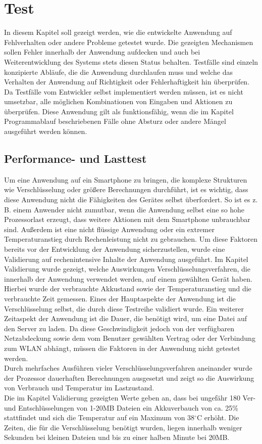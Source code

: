 \documentclass[10pt, a4paper,headsepline,pointednumbers]{scrreprt}
\begin{document}
\chapter{Test}
In diesem Kapitel soll gezeigt werden, wie die entwickelte Anwendung auf Fehlverhalten oder andere Probleme getestet wurde. Die gezeigten Mechanismen sollen Fehler innerhalb der Anwendung aufdecken und auch bei Weiterentwicklung des Systems stets diesen Status behalten. Testfälle sind einzeln konzipierte Abläufe, die die Anwendung durchlaufen muss und welche das Verhalten der Anwendung auf Richtigkeit oder Fehlerhaftigkeit hin überprüfen. Da Testfälle vom Entwickler selbst implementiert werden müssen, ist es nicht umsetzbar, alle möglichen Kombinationen von Eingaben und Aktionen zu überprüfen. Diese Anwendung gilt als funktionsfähig, wenn die im Kapitel Programmablauf beschriebenen Fälle ohne Absturz oder andere Mängel ausgeführt werden können.


\section{Performance- und Lasttest}
Um eine Anwendung auf ein Smartphone zu bringen, die komplexe Strukturen wie Verschlüsselung oder größere Berechnungen durchführt, ist es wichtig, dass diese Anwendung nicht die Fähigkeiten des Gerätes selbst überfordert. So ist es z. B. einem Anwender nicht zumutbar, wenn die Anwendung selbst eine so hohe Prozessorlast erzeugt, dass weitere Aktionen mit dem Smartphone unbrauchbar sind. Außerdem ist eine nicht flüssige Anwendung oder ein extremer Temperaturanstieg durch Rechenleistung nicht zu gebrauchen. Um diese Faktoren bereits vor der Entwicklung der Anwendung sicherzustellen, wurde eine Validierung auf rechenintensive Inhalte der Anwendung ausgeführt. Im Kapitel Validierung wurde gezeigt, welche Auswirkungen Verschlüsselungsverfahren, die innerhalb der Anwendung verwendet werden, auf einem gewählten Gerät haben. Hierbei wurde der verbrauchte Akkustand sowie der Temperaturanstieg und die verbrauchte Zeit gemessen. Eines der Hauptaspekte der Anwendung ist die Verschlüsselung selbst, die durch diese Testreihe validiert wurde. Ein weiterer Zeitaspekt der Anwendung ist die Dauer, die benötigt wird, um eine Datei auf den Server zu laden. Da diese Geschwindigkeit jedoch von der verfügbaren Netzabdeckung sowie dem vom Benutzer gewählten Vertrag oder der Verbindung zum WLAN abhängt,  müssen die Faktoren in der Anwendung nicht getestet werden. \\
Durch mehrfaches Ausführen vieler Verschlüsselungsverfahren aneinander wurde der Prozessor dauerhaften Berechnungen ausgesetzt und zeigt so die Auswirkung von Verbrauch und Temperatur im Lastzustand. \\
Die im Kapitel Validierung gezeigten Werte geben an, dass bei ungefähr 180 Ver- und Entschlüsselungen von 1-20MB Dateien ein Akkuverbauch von ca. 25\% stattfindet und sich die Temperatur auf ein Maximum von 38$^\circ$C erhöht. Die Zeiten, die für die Verschlüsselung benötigt wurden, liegen innerhalb weniger Sekunden bei kleinen Dateien und bis zu einer halben Minute bei 20MB. 
\end{document}
